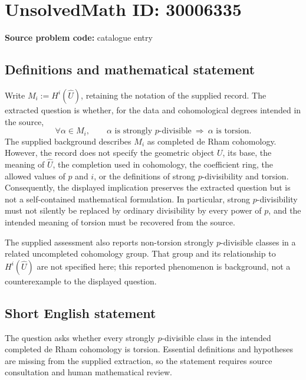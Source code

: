 \documentclass[11pt]{article}
\begin{document}
\section*{UnsolvedMath ID: 30006335}
\textbf{Source problem code:} catalogue entry
\subsection{Definitions and mathematical statement}
Write \(M_i:=H^i(\widehat U)\), retaining the notation of the supplied record. The extracted question is whether, for the data and cohomological degrees intended in the source,
\[
\forall\alpha\in M_i,\qquad
\alpha\text{ is strongly }p\text{-divisible}
\ \Longrightarrow\ 
\alpha\text{ is torsion}.
\]
The supplied background describes \(M_i\) as completed de Rham cohomology. However, the record does not specify the geometric object \(U\), its base, the meaning of \(\widehat U\), the completion used in cohomology, the coefficient ring, the allowed values of \(p\) and \(i\), or the definitions of strong \(p\)-divisibility and torsion. Consequently, the displayed implication preserves the extracted question but is not a self-contained mathematical formulation. In particular, strong \(p\)-divisibility must not silently be replaced by ordinary divisibility by every power of \(p\), and the intended meaning of torsion must be recovered from the source.

The supplied assessment also reports non-torsion strongly \(p\)-divisible classes in a related uncompleted cohomology group. That group and its relationship to \(H^i(\widehat U)\) are not specified here; this reported phenomenon is background, not a counterexample to the displayed question.
\subsection{Short English statement}
The question asks whether every strongly \(p\)-divisible class in the intended completed de Rham cohomology is torsion. Essential definitions and hypotheses are missing from the supplied extraction, so the statement requires source consultation and human mathematical review.
\end{document}
